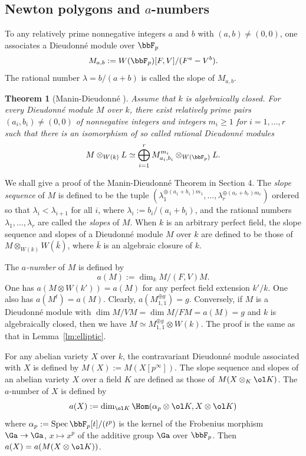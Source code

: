 \documentclass[]{amsart}
\theoremstyle{plain}
\newtheorem{thm}{Theorem}
\theoremstyle{definition}
\theoremstyle{remark}
\def\Spec{{\rm Spec}\,}
\def\Fp{{\bbF}_p}
\newcommand{\<}{\langle}   %
\renewcommand{\>}{\rangle} %
\newcommand{\ac}{algebraically closed }
\newcommand{\dieu}{Dieudonn\'{e} }
\begin{document}
\subsection{Newton polygons and $a$-numbers}
To any relatively prime nonnegative integers $a$ and
$b$ with $(a,b)\neq (0,0)$, one associates a \dieu module over $\Fp$
\[ M_{a,b}:=W(\Fp)[F,V]/(F^a-V^b). \]
The rational number $\lambda=b/(a+b)$ is called the slope of $M_{a,b}$. 

\begin{thm}[{Manin-Dieudonn\'e \cite[Chap.~II, ``Classification Theorem'',
  p.~35]{manin:thesis}}]\label{thm:5}
Assume that $k$ is algebraically closed. For every \dieu module $M$ over $k$, there exist relatively prime pairs $(a_i,b_i)\neq (0,0)$ of
nonnegative integers and integers $m_i\ge 1$ for $i=1,\dots ,r$ such that
there is an isomorphism of so called rational \dieu modules
\begin{equation}
  \label{eq:2.1}
M\otimes_{W(k)} L \simeq \bigoplus_{i=1}^r M_{a_i,b_i}^{m_i} \otimes_{W(\Fp)} L.  
\end{equation} 
\end{thm}

We shall give a proof of the Manin-\dieu Theorem in Section 4. 
The \emph{slope sequence} of $M$ is defined to be the tuple $(\lambda_1^{\oplus
  (a_1+b_1)m_1},\dots ,\lambda_r^{\oplus
  (a_r+b_r)m_r})$ ordered so that $\lambda_i<\lambda_{i+1}$ for all $i$,
  where $\lambda_i:=b_i/(a_i+b_i)$, and the rational numbers $\lambda_1,\dots, \lambda_r$
  are called the \emph{slopes} of $M$. When $k$ is an arbitrary perfect field, the slope sequence and slopes of a \dieu module $M$ over $k$ are defined to be those of $M\otimes_{W(k)} W(\bar k)$, where $\bar k$ is an algebraic closure of $k$.
  







The \emph{$a$-number} of $M$ is defined by \[ a(M):=\dim_k M/(F,V)M. \] 
One has $a(M\otimes W(k'))=a(M)$ for any perfect field extension $k'/k$. One also has $a(M^t)=a(M)$.
Clearly, $a(M_{1,1}^{\oplus g})=g$. Conversely, if $M$ is
a \dieu module with $\dim M/VM=\dim M/FM=a(M)=g$ and $k$ is algebraically closed, then we have $M\simeq M_{1,1}^{\oplus g}\otimes W(k)$. The proof is the same as that in Lemma~\ref{lm:elliptic}.

For any abelian variety $X$ over $k$, the contravariant \dieu module associated with $X$ is defined by $M(X):=M(X[p^\infty])$.
The slope sequence and slopes of an abelian variety $X$ over a field $K$ are defined as those of $M(X\otimes_K \ol K)$. The $a$-number of $X$ is defined by 
\begin{equation}\label{eq:2.2}
a(X):=\dim_{\ol K} \Hom(\alpha_p \otimes \ol K, X\otimes \ol K)  
\end{equation}
where $\alpha_p:=\Spec \Fp[t]/(t^p)$ is the kernel of the Frobenius morphism $\Ga\to \Ga$, $x \mapsto x^p$ of the additive group $\Ga$ over $\Fp$. Then $a(X)=a(M(X\otimes \ol K))$.
\end{document}
